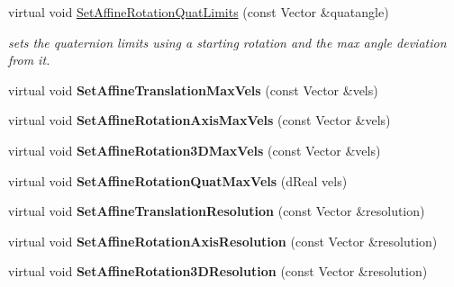 \begin{DoxyCompactItemize}
\item 
virtual void \hyperlink{classOpenRAVE_1_1RobotBase_a5b49831e704d28f7228dbc317add6efc}{SetAffineRotationQuatLimits} (const Vector \&quatangle)
\begin{DoxyCompactList}\small\item\em sets the quaternion limits using a starting rotation and the max angle deviation from it. \item\end{DoxyCompactList}\item 
\hypertarget{classOpenRAVE_1_1RobotBase_a6c09d769ec334623646521b39565d95e}{
virtual void {\bfseries SetAffineTranslationMaxVels} (const Vector \&vels)}
\label{classOpenRAVE_1_1RobotBase_a6c09d769ec334623646521b39565d95e}

\item 
\hypertarget{classOpenRAVE_1_1RobotBase_a9540e66fefbfbb2c4cbe3fb0614be6fe}{
virtual void {\bfseries SetAffineRotationAxisMaxVels} (const Vector \&vels)}
\label{classOpenRAVE_1_1RobotBase_a9540e66fefbfbb2c4cbe3fb0614be6fe}

\item 
\hypertarget{classOpenRAVE_1_1RobotBase_aca639b7d618f16865b23db95c94e78e6}{
virtual void {\bfseries SetAffineRotation3DMaxVels} (const Vector \&vels)}
\label{classOpenRAVE_1_1RobotBase_aca639b7d618f16865b23db95c94e78e6}

\item 
\hypertarget{classOpenRAVE_1_1RobotBase_ab7a68cd681ffee1ae12c186539971a19}{
virtual void {\bfseries SetAffineRotationQuatMaxVels} (dReal vels)}
\label{classOpenRAVE_1_1RobotBase_ab7a68cd681ffee1ae12c186539971a19}

\item 
\hypertarget{classOpenRAVE_1_1RobotBase_a8c9f1eb0dddfebee4c61f1919f01d377}{
virtual void {\bfseries SetAffineTranslationResolution} (const Vector \&resolution)}
\label{classOpenRAVE_1_1RobotBase_a8c9f1eb0dddfebee4c61f1919f01d377}

\item 
\hypertarget{classOpenRAVE_1_1RobotBase_ab1ab13a4085dec73ce772f138c1f299f}{
virtual void {\bfseries SetAffineRotationAxisResolution} (const Vector \&resolution)}
\label{classOpenRAVE_1_1RobotBase_ab1ab13a4085dec73ce772f138c1f299f}

\item 
\hypertarget{classOpenRAVE_1_1RobotBase_ad6392e792d3f470609ef7c30f1bcf21a}{
virtual void {\bfseries SetAffineRotation3DResolution} (const Vector \&resolution)}
\label{classOpenRAVE_1_1RobotBase_ad6392e792d3f470609ef7c30f1bcf21a}


\end{DoxyCompactItemize}
